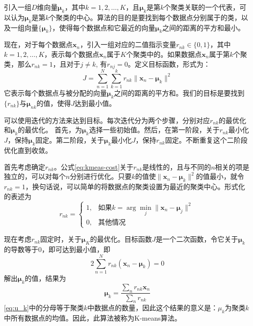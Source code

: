 \documentclass[11pt]{ctexbook}
\begin{document}
引入一组$D$维向量$\bm \mu_k$，其中$k=1, 2, \ldots, K$，且$\bm \mu_k$是第$k$个聚类关联的一个代表，可以认为$\bm \mu_k$是第$k$个聚类的中心。算法的目的是要找到每个数据点分别属于的类，以及一组向量$\{\bm \mu_k\}$，使得每个数据点和它最近的向量$\bm \mu_k$之间的距离的平方和最小。

现在，对于每个数据点$\bm x_n$，引入一组对应的二值指示变量$r_{nk} \in \{0, 1\}$，其中 $k = 1, 2, \ldots, K$，表示每个数据点$\bm x_n$属于$K$个聚类中的。如果数据点$\bm x_n$属于第$k$个聚类，那么$r_{nk}=1$，且对于$j \neq k$, 有$r_{nj} = 0$。定义目标函数，形式为：
\begin{equation}
	\label{eq:kmeas-cost}
	J = \sum_{n=1}^{N}\sum_{k=1}^{k}r_{nk}\| \bm x_n - \bm \mu_k \|^2
\end{equation}
它表示每个数据点与被分配的向量$\bm \mu_k$之间的距离的平方和。我们的目标是要找到$\{r_{nk}\}$与$\bm \mu_{nk}$的值，使得$J$达到最小值。

可以使用迭代的方法来达到目标。每次迭代分为两个步骤，分别对应$r_{nk}$的最优化和$\bm \mu_k$的最优化。 首先，为$\bm \mu_k$选择一些初始值。然后，在第一阶段，关于$r_{nk}$最小化$J$，保持$\bm \mu_k$固定。第二阶段，关于$\bm \mu_k$最小化$J$，保持$r_{nk}$固定。不断重复这个二阶段优化直到收敛。

首先考虑确定$r_{nk}$。公式\ref{eq:kmeas-cost}关于$r_{nk}$是线性的，且与不同的$n$相关的项是独立的，可以对每个$n$分别进行优化。只要$k$的值使$\|\bm x_n-\bm \mu_k\|^2$的值最小，就令$r_{nk}=1$，换句话说，可以简单的将数据点的聚类设置为最近的聚类中心。形式化的表述为
\begin{equation}
	r_{nk} = \left\{\begin{array}{ll}
		1, & \text{如果} k = \arg\min_{j} \| \bm x_n - \bm \mu_j\|^2 \\
		0, & \text{其他情况}
	\end{array}\right.
\end{equation}

现在考虑$r_{nk}$固定时，关于$\bm \mu_K$的最优化。目标函数$J$是一个二次函数，令它关于$\bm \mu_k$的导数等于$0$，即可达到最小值，即
\begin{equation}
	2\sum_{n=1}^{N}r_{nk}(\bm x_n - \bm \mu_k) = 0
\end{equation}
解出$\bm \mu_k$的值，结果为
\begin{equation}
	\label{eq:u_k}
	\bm \mu_k = \frac{\sum_n r_{nk}\bm x_n}{\sum_n r_{nk}}
\end{equation}
\ref{eq:u_k}中的分母等于聚类$k$中数据点的数量，因此这个结果的意义是：$\mu_k$为聚类$k$中所有数据点的均值。因此，此算法被称为K-means算法。
\end{document}
